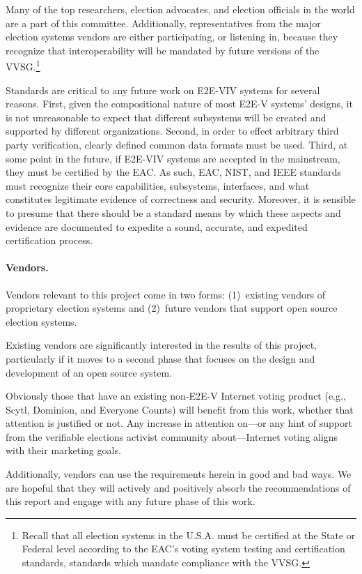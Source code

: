 Many of the top researchers, election advocates, and election
officials in the world are a part of this committee. Additionally,
representatives from the major election systems vendors are either
participating, or listening in, because they recognize that
interoperability will be mandated by future versions of the
VVSG.\footnote{Recall that all election systems in the U.S.A. must be
  certified at the State or Federal level according to the EAC's
  voting system testing and certification standards, standards which
  mandate compliance with the VVSG.}

Standards are critical to any future work on E2E-VIV systems for
several reasons. First, given the compositional nature of most E2E-V
systems' designs, it is not unreasonable to expect that different
subsystems will be created and supported by different organizations.
Second, in order to effect arbitrary third party verification, clearly
defined common data formats must be used. Third, at some point in the
future, if E2E-VIV systems are accepted in the mainstream, they must
be certified by the EAC. As such, EAC, NIST, and IEEE standards must
recognize their core capabilities, subsystems, interfaces, and what
constitutes legitimate evidence of correctness and security. Moreover,
it is sensible to presume that there should be a standard means by
which these aspects and evidence are documented to expedite a sound,
accurate, and expedited certification process.

\paragraph{Vendors.} Vendors relevant to this project come in two
forms: (1)~existing vendors of proprietary election systems and
(2)~future vendors that support open source election systems.

Existing vendors are significantly interested in the results of this
project, particularly if it moves to a second phase that focuses on
the design and development of an open source system.

Obviously those that have an existing non-E2E-V Internet voting
product (e.g., Scytl, Dominion, and Everyone Counts) will benefit from
this work, whether that attention is justified or not. Any increase in
attention on---or any hint of support from the verifiable elections
activist community about---Internet voting aligns with their marketing
goals.

Additionally, vendors can use the requirements herein in good and bad
ways. We are hopeful that they will actively and positively absorb the
recommendations of this report and engage with any future phase of
this work.

